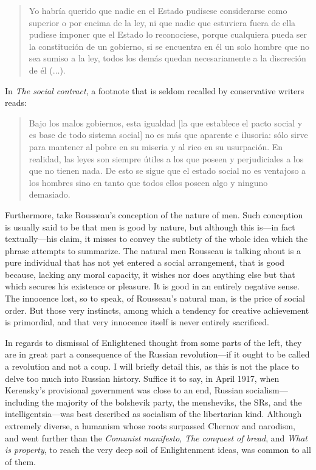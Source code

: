 \documentclass[a4paper]{article}
\begin{document}
\begin{quote}
    Yo habría querido que nadie en el Estado pudisese considerarse como superior
    o por encima de la ley, ni que nadie que estuviera fuera de ella pudiese
    imponer que el Estado lo reconociese, porque cualquiera pueda ser la
    constitución de un gobierno, si se encuentra en él un solo hombre que no sea
    sumiso a la ley, todos los demás quedan necesariamente a la discreción de él
    ($\ldots$).
\end{quote}

In \textit{The social contract}, a footnote that is seldom recalled by
conservative writers reads:

\begin{quote}
    Bajo los malos gobiernos, esta igualdad [la que establece el pacto social y
    es base de todo sistema social] no es más que aparente e ilusoria: sólo
    sirve para mantener al pobre en su miseria y al rico en su usurpación. En
    realidad, las leyes son siempre útiles a los que poseen y perjudiciales a
    los que no tienen nada. De esto se sigue que el estado social no es
    ventajoso a los hombres sino en tanto que todos ellos poseen algo y ninguno
    demasiado.
\end{quote}

Furthermore, take Rousseau's conception of the nature of men. Such conception is
usually said to be that men is good by nature, but although this is---in fact
textually---his claim, it misses to convey the subtlety of the whole idea which
the phrase attempts to summarize. The natural men Rousseau is talking about is a
pure individual that has not yet entered a social arrangement, that is good
because, lacking any moral capacity, it wishes nor does anything else but that
which secures his existence or pleasure. It is good in an entirely negative
sense. The innocence lost, so to speak, of Rousseau's natural man, is the price
of social order. But those very instincts, among which a tendency for creative
achievement is primordial, and that very innocence itself is never entirely
sacrificed.

In regards to dismissal of Enlightened thought from some parts of the left, they
are in great part a consequence of the Russian revolution---if it ought to be
called a revolution and not a coup. I will briefly detail this, as this is not
the place to delve too much into Russian history. Suffice it to say, in April
1917, when Kerensky's provisional government was close to an end, Russian
socialism---including the majority of the bolshevik party, the mensheviks, the
SRs, and the intelligentsia---was best described as socialism of the libertarian
kind. Although extremely diverse, a humanism whose roots surpassed Chernov and
narodism, and went further than the \textit{Comunist manifesto}, \textit{The
conquest of bread}, and \textit{What is property}, to reach the very deep soil
of Enlightenment ideas, was common to all of them. 
\end{document}
